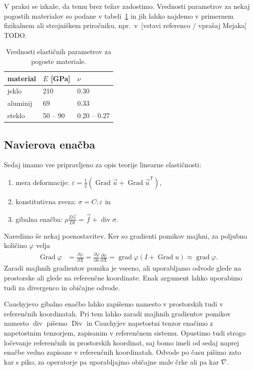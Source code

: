 \documentclass[12pt,a4paper,twoside]{article}
\theoremstyle{definition} %
\theoremstyle{plain} %
\numberwithin{equation}{section}
\newcommand{\T}{\mathsf{T}}
\renewcommand{\div}{\operatorname{div}}
\newcommand{\grad}{\operatorname{grad}}
\newcommand{\Div}{\operatorname{Div}}
\newcommand{\Grad}{\operatorname{Grad}}
\renewcommand{\phi}{\varphi}
\newcommand{\eps}{\varepsilon}
\newcommand{\dpar}[2]{\ensuremath{\frac{\partial #1}{\partial #2}}}
\newcommand{\DD}[2]{\ensuremath{\frac{D #1}{D #2}}}
\newcommand{\DDt}[1]{\DD{#1}{t}}
\newcommand{\vv}{\vec{v}}
\newcommand{\vu}{\vec{u}}
\newcommand{\vf}{\vec{f}}
\newcommand{\vX}{X}
\newcommand{\vx}{x}
\newcommand{\ts}{\sigma}
\begin{document}
V praksi se izkaže, da temu brez težav zadostimo. Vrednosti parametrov za nekaj
pogostih materialov so podane v tabeli~\ref{tab:Enu} in jih lahko najdemo v
primernem fizikalnem ali strojniškem priročniku, npr.\ v~[vstavi referenco / vprašaj
Mejaka] TODO.
\begin{table}[h]
  \centering
  \begin{tabular}{|l|l|l|} \hline
    material & $E$ [\unit{GPa}] & $\nu$ \\ \hline
    jeklo    & 210 & 0.30 \\
    aluminij & 69 & 0.33 \\
    steklo   & 50 -- 90 & 0.20 -- 0.27 \\ \hline
  \end{tabular}
  \caption{Vrednosti elastičnih parametrov za pogoste materiale.}
  \label{tab:Enu}
\end{table}

\subsection{Navierova enačba}
Sedaj imamo vse pripravljeno za opis teorije linearne elastičnosti:
\begin{enumerate}[\indent 1)]
  \item mera deformacije: $\eps = \frac12(\Grad \vu + \Grad \vu^\T)$,
  \item konstitutivna zveza: $\ts = C : \eps$ in
  \item gibalna enačba: $\rho \DDt{\vv} = \vf + \div \ts$.
\end{enumerate}

Naredimo še nekaj poenostavitev. Ker so gradienti pomikov majhni,
za poljubno količino $\phi$ velja
\begin{align*}
  \Grad\phi &= \dpar{\phi}{\vX} = \dpar{\phi}{\vx} \dpar{\vx}{\vX} = \grad\phi
  (I + \Grad u) \approx \grad \phi.
\end{align*}
Zaradi majhnih gradientov pomika je vseeno, ali uporabljamo odvode glede na
prostorske ali glede na referenčne koordinate. Enak argument lahko uporabimo
tudi za divergenco in običajne odvode.

Cauchyjevo gibalno enačbo lahko zapišemo namesto v prostorskih tudi v referenčnih
koordinatah. Pri tem lahko zaradi majhnih gradientov pomikov namesto $\div$
pišemo $\Div$ in Cauchyjev napetostni tenzor enačimo z napetostnim tenzorjem,
zapisanim v referenčnem sistemu. Opustimo tudi strogo ločevanje referenčnih in
prostorskih koordinat, saj bomo imeli od sedaj naprej enačbe vedno zapisane v
referenčnih koordinatah. Odvode po času pišimo zato kar s piko, za operatorje pa
uporabljajmo običajne male črke ali pa kar $\nabla$.
\end{document}

